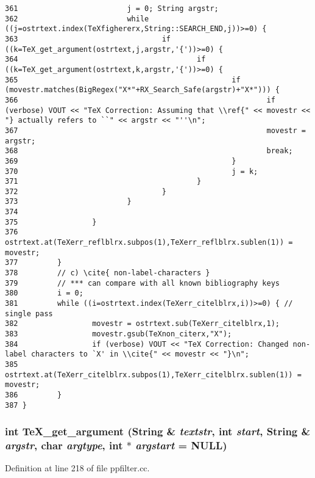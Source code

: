 \begin{verbatim}
361                         j = 0; String argstr;
362                         while ((j=ostrtext.index(TeXfighererx,String::SEARCH_END,j))>=0) {
363                                 if ((k=TeX_get_argument(ostrtext,j,argstr,'{'))>=0) {
364                                         if ((k=TeX_get_argument(ostrtext,k,argstr,'{'))>=0) {
365                                                 if (movestr.matches(BigRegex("X*"+RX_Search_Safe(argstr)+"X*"))) {
366                                                         if (verbose) VOUT << "TeX Correction: Assuming that \\ref{" << movestr << "} actually refers to ``" << argstr << "''\n";
367                                                         movestr = argstr;
368                                                         break;
369                                                 }
370                                                 j = k;
371                                         }
372                                 }
373                         }
374                         
375                 }
376                 ostrtext.at(TeXerr_reflblrx.subpos(1),TeXerr_reflblrx.sublen(1)) = movestr;
377         }
378         // c) \cite{ non-label-characters }
379         // *** can compare with all known bibliography keys
380         i = 0;
381         while ((i=ostrtext.index(TeXerr_citelblrx,i))>=0) { // single pass
382                 movestr = ostrtext.sub(TeXerr_citelblrx,1);
383                 movestr.gsub(TeXnon_citerx,"X");
384                 if (verbose) VOUT << "TeX Correction: Changed non-label characters to `X' in \\cite{" << movestr << "}\n";
385                 ostrtext.at(TeXerr_citelblrx.subpos(1),TeXerr_citelblrx.sublen(1)) = movestr;
386         }
387 }
\end{verbatim}\normalsize 
{}
\subsubsection{\setlength{\rightskip}{0pt plus 5cm}int Te\-X\_\-get\_\-argument ({\bf String} \& {\em textstr}, int {\em start}, {\bf String} \& {\em argstr}, char {\em argtype}, int $\ast$ {\em argstart} = NULL)}\label{ppfilter_8cc_a5}




Definition at line 218 of file ppfilter.cc.

